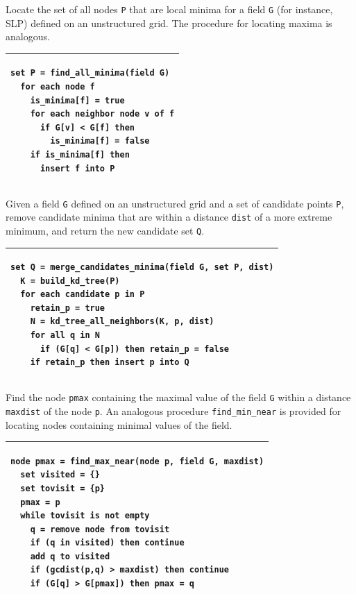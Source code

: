 \documentclass[gmdd, hvmath, online]{copernicus_discussions}
\begin{document}

\begin{algorithm}
\caption{Locate the set of all nodes \texttt{P} that are local minima for a field \texttt{G} (for instance, SLP) defined on an unstructured grid.  The procedure for locating maxima is analogous.\ \\} \label{alg:find_all_minima}
\noindent \begin{tabular}{p{5in}}
\hline \small \begin{verbatim}
set P = find_all_minima(field G)
  for each node f
    is_minima[f] = true
    for each neighbor node v of f
      if G[v] < G[f] then
        is_minima[f] = false
    if is_minima[f] then
      insert f into P
\end{verbatim} \\
\hline
\end{tabular}
\end{algorithm}

\begin{algorithm}
\caption{Given a field \texttt{G} defined on an unstructured grid and a set of candidate points \texttt{P}, remove candidate minima that are within a distance \texttt{dist} of a more extreme minimum, and return the new candidate set \texttt{Q}.\ \\} \label{alg:merge_candidates_minima}
\noindent \begin{tabular}{p{5in}}
\hline \small \begin{verbatim}
set Q = merge_candidates_minima(field G, set P, dist)
  K = build_kd_tree(P)
  for each candidate p in P
    retain_p = true
    N = kd_tree_all_neighbors(K, p, dist)
    for all q in N
      if (G[q] < G[p]) then retain_p = false
    if retain_p then insert p into Q
\end{verbatim} \\
\hline
\end{tabular}
\end{algorithm}

\begin{algorithm}
\caption{Find the node \texttt{pmax} containing the maximal value of the field \texttt{G} within a distance \texttt{maxdist} of the node \texttt{p}.  An analogous procedure \texttt{find\_min\_near} is provided for locating nodes containing minimal values of the field.\ \\} \label{alg:find_max_near}
\noindent \begin{tabular}{p{5in}}
\hline \small \begin{verbatim}
node pmax = find_max_near(node p, field G, maxdist)
  set visited = {}
  set tovisit = {p}
  pmax = p
  while tovisit is not empty
    q = remove node from tovisit
    if (q in visited) then continue
    add q to visited
    if (gcdist(p,q) > maxdist) then continue
    if (G[q] > G[pmax]) then pmax = q
\end{verbatim} \\
\hline
\end{tabular}
\end{algorithm}
\end{document}
